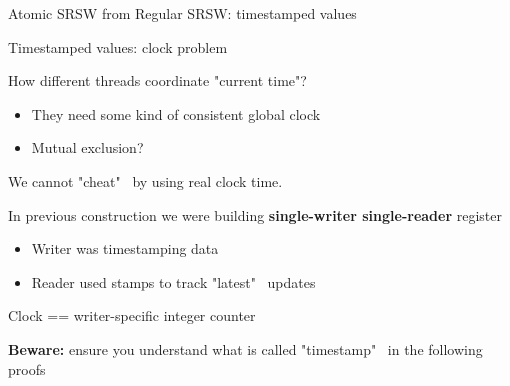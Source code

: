 \begin{frame}[fragile]{Atomic SRSW from Regular SRSW: timestamped values}




\end{frame}


\begin{frame}{Timestamped values: clock problem}

How different threads coordinate "current time"?
\begin{itemize}
  \pause
  \item They need some kind of consistent global clock
  \pause
  \item Mutual exclusion?
\end{itemize}

\pause
We cannot "cheat" \ by using real clock time. 

\pause
In previous construction we were building \textbf{single-writer single-reader} register
\begin{itemize}
  \pause
  \item Writer was timestamping data

  \pause
  \item Reader used stamps to track "latest" \ updates
\end{itemize}

\pause
Clock == writer-specific integer counter

\pause
\textbf{Beware:} ensure you understand what is called "timestamp" \ in the following proofs

\end{frame}


